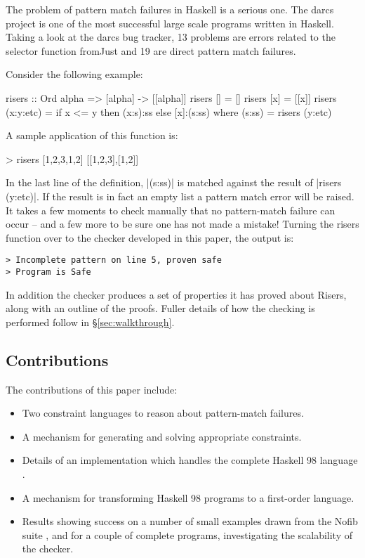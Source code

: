 \documentclass[preprint]{sigplanconf}
\newcommand{\C}[1]{\textsf{#1}}
\begin{document}
The problem of pattern match failures in Haskell is a serious one. The darcs \citep{darcs} project is one of the most successful large scale programs written in Haskell. Taking a look at the darcs bug tracker, 13 problems are errors related to the selector function \C{fromJust} and 19 are direct pattern match failures.

Consider the following example:

\begin{code}
risers :: Ord alpha => [alpha] -> [[alpha]]
risers [] = []
risers [x] = [[x]]
risers (x:y:etc) = if x <= y then (x:s):ss else [x]:(s:ss)
    where (s:ss) = risers (y:etc)
\end{code}

A sample application of this function is:

\begin{code}
> risers [1,2,3,1,2]
[[1,2,3],[1,2]]
\end{code}

In the last line of the definition, |(s:ss)| is matched against the result of |risers (y:etc)|. If the result is in fact an empty list a pattern match error will be raised. It takes a few moments to check manually that no pattern-match failure can occur -- and a few more to be sure one has not made a mistake! Turning the \C{risers} function over to the checker developed in this paper, the output is:

\begin{verbatim}
> Incomplete pattern on line 5, proven safe
> Program is Safe
\end{verbatim}

In addition the checker produces a set of properties it has proved about Risers, along with an outline of the proofs. Fuller details of how the checking is performed follow in \S\ref{sec:walkthrough}.

\subsection{Contributions}

The contributions of this paper include:

\begin{itemize}
\item Two constraint languages to reason about pattern-match failures.
\item A mechanism for generating and solving appropriate constraints.
\item Details of an implementation which handles the complete Haskell 98 language \citep{haskell}.
\item A mechanism for transforming Haskell 98 programs to a first-order language.
\item Results showing success on a number of small examples drawn from the Nofib suite \citep{nofib}, and for a couple of complete programs, investigating the scalability of the checker.
\end{itemize}
\end{document}
